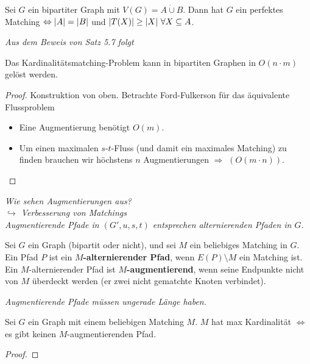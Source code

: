 \begin{korollar}
	Sei $G$ ein bipartiter Graph mit $V(G) = A\dot\cup B$. Dann hat $G$ ein perfektes Matching $\Leftrightarrow \vert A \vert=\vert B \vert$ und $\vert T(X) \vert \ge \vert X \vert~\forall X \subseteq A$.
\end{korollar}
\textit{Aus dem Beweis von Satz 5.7 folgt}
\begin{korollar}
	Das Kardinalitätsmatching-Problem kann in bipartiten Graphen in $O(n\cdot m)$ gelöst werden.
\end{korollar}
\begin{proof}
	Konstruktion von oben. Betrachte Ford-Fulkerson für das äquivalente Flussproblem
	\begin{itemize}
		\item Eine Augmentierung benötigt $O(m)$.
		\item Um einen maximalen $s$-$t$-Fluss (und damit ein maximales Matching) zu finden brauchen wir höchstens $n$ Augmentierungen $\Rightarrow$ $(O(m\cdot n))$.
	\end{itemize}
\end{proof}
\textit{Wie sehen Augmentierungen aus?\\
\hspace*{10pt}$\hookrightarrow$ Verbesserung von Matchings\\
Augmentierende Pfade in $(G',u,s,t)$ entsprechen alternierenden Pfaden in $G$.}
\begin{definition}
	Sei $G$ ein Graph (bipartit oder nicht), und sei $M$ ein beliebiges Matching in $G$. Ein Pfad $P$ ist ein \textbf{$M$-alternierender Pfad}, wenn $E(P)\setminus M$ ein Matching ist. Ein $M$-alternierender Pfad ist \textbf{$M$-augmentierend}, wenn seine Endpunkte nicht von $M$ überdeckt werden (er zwei nicht gematchte Knoten verbindet).
\end{definition}
\textit{Augmentierende Pfade müssen ungerade Länge haben.}
\begin{satz}[Berg, 1957]
	Sei $G$ ein Graph mit einem beliebigen Matching $M$. $M$ hat max Kardinalität $\Leftrightarrow$ es gibt keinen $M$-augmentierenden Pfad.
\end{satz}
\begin{proof}
	
\end{proof}
